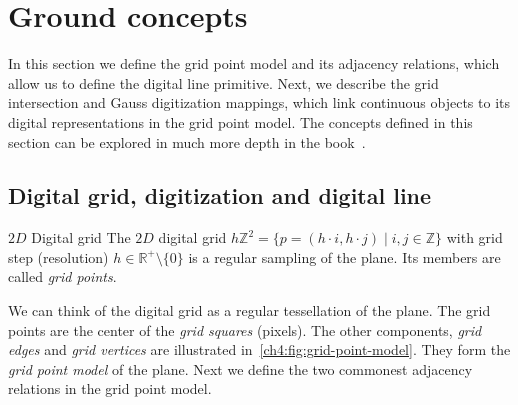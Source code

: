 \section{Ground concepts}\label{ch4:sec:ground-concepts}

In this section we define the grid point model and its adjacency relations, which allow us to define the digital line primitive. Next, we describe the grid intersection and Gauss digitization mappings, which link continuous objects to its digital representations in the grid point model. The concepts defined in this section can be explored in much more depth in the book~\cite{klette04digital}.

\subsection{Digital grid, digitization and digital line}

\begin{definition}{$2D$ Digital grid}
The $2D$ digital grid $h\mathbb{Z}^2 = \{ p = (h \cdot i,h \cdot j) \; | \; i,j \in \mathbb{Z}\}$ with grid step (resolution) $h \in \mathbb{R}^+ \setminus \{0\}$ is a regular sampling of the plane. Its members are called \emph{grid points}.
\end{definition}

We can think of the digital grid as a regular tessellation of the plane. The grid points are the center of the \emph{grid squares} (pixels). The other components, \emph{grid edges } and \emph{grid vertices} are illustrated in~\cref{ch4:fig:grid-point-model}. They form the \emph{grid point model} of the plane. Next we define the two commonest adjacency relations in the grid point model.

